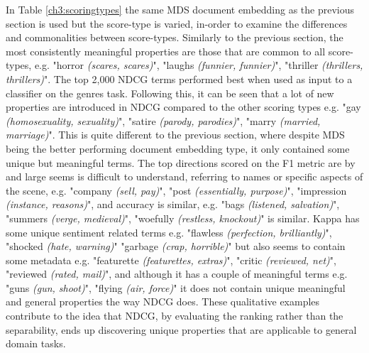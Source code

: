 In Table \ref{ch3:scoringtypes} the same MDS document embedding as the previous section is used but the score-type is varied, in-order to examine the differences and commonalities between score-types.  Similarly to the previous section,   the most consistently meaningful properties are those that are common to all score-types, e.g. "horror \textit{(scares, scares)}", "laughs \textit{(funnier, funnier)}", "thriller \textit{(thrillers, thrillers)}". The top 2,000 NDCG terms performed best when used as input to a classifier on the genres task. Following this, it can be seen that a lot of new properties are introduced in NDCG compared to the other scoring types e.g. "gay \textit{(homosexuality, sexuality)}", "satire \textit{(parody, parodies)}",  "marry \textit{(married, marriage)}". This is quite different to the previous section, where despite MDS being the better performing document embedding type, it only contained some unique but meaningful terms. The top directions scored on  the F1 metric  are by and large seems is difficult to understand, referring to names or specific aspects of the scene, e.g. "company \textit{(sell, pay)}", "post \textit{(essentially, purpose)}", "impression \textit{(instance, reasons)}", and accuracy is similar, e.g. "bags \textit{(listened, salvation)}",  "summers \textit{(verge, medieval)}", "woefully \textit{(restless, knockout)}" is similar. Kappa has some unique sentiment related terms e.g. "flawless \textit{(perfection, brilliantly)}", "shocked \textit{(hate, warning)}" "garbage \textit{(crap, horrible)}" but also seems to contain some metadata e.g. "featurette \textit{(featurettes, extras)}", "critic \textit{(reviewed, net)}", "reviewed \textit{(rated, mail)}", and although it has  a couple of meaningful terms e.g. "guns \textit{(gun, shoot)}", "flying \textit{(air, force)}" it does not contain unique meaningful and general properties the way NDCG does. These qualitative examples contribute to the idea that NDCG, by evaluating the ranking rather than the separability, ends up discovering unique properties that are applicable to general domain tasks.
